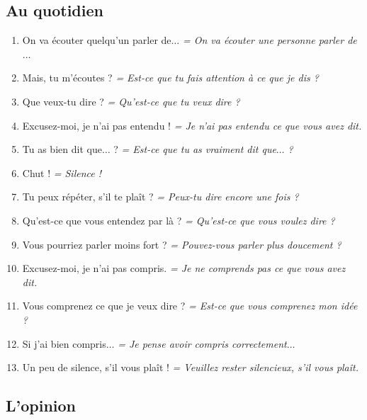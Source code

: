 \documentclass[math,code]{amznotes}
\theoremstyle{remark}
\begin{document}
\subsection*{Au quotidien}

\begin{enumerate}
    \item On va écouter quelqu'un parler de$\dots$ \textit{= On va écouter une personne parler de$\dots$}
    
    \item Mais, tu m'écoutes ? \textit{= Est-ce que tu fais attention à ce que je dis ?}
    
    \item Que veux-tu dire ? \textit{= Qu'est-ce que tu veux dire ?}
    
    \item Excusez-moi, je n'ai pas entendu ! \textit{= Je n'ai pas entendu ce que vous avez dit.}
    
    \item Tu as bien dit que$\dots$ ? \textit{= Est-ce que tu as vraiment dit que$\dots$ ?}
    
    \item Chut ! \textit{= Silence !}
    
    \item Tu peux répéter, s'il te plaît ? \textit{= Peux-tu dire encore une fois ?}
    
    \item Qu'est-ce que vous entendez par là ? \textit{= Qu'est-ce que vous voulez dire ?}
    
    \item Vous pourriez parler moins fort ? \textit{= Pouvez-vous parler plus doucement ?}
    
    \item Excusez-moi, je n'ai pas compris. \textit{= Je ne comprends pas ce que vous avez dit.}
    
    \item Vous comprenez ce que je veux dire ? \textit{= Est-ce que vous comprenez mon idée ?}
    
    \item Si j'ai bien compris$\dots$ \textit{= Je pense avoir compris correctement$\dots$}
    
    \item Un peu de silence, s'il vous plaît ! \textit{= Veuillez rester silencieux, s'il vous plaît.}
\end{enumerate}

\subsection*{L'opinion}
\end{document}
